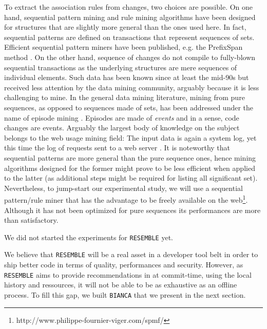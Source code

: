 To extract the association rules from changes,
two choices are possible. On one hand, sequential pattern mining and rule mining algorithms
have been designed for structures that are slightly more general than the ones used here.
In fact, sequential patterns are defined on transactions that represent sequences of sets.
Efficient sequential pattern miners have been published, e.g. the PrefixSpan method \cite{Pei2004}.
On the other hand, sequence of changes do not compile to fully-blown sequential transactions as the underlying structures are mere sequences of individual elements. Such data has been known since at least the mid-90s but received less attention by the data mining community, arguably because it is less challenging to mine.
In the general data mining literature, mining from pure sequences, as opposed to sequences made of sets, has been addressed under the name of episode mining \cite{HEIKKI1997}.
Episodes are made of \textit{events} and in a sense, code changes are events. Arguably the largest body of knowledge on the subject belongs to the web usage mining field: The input data is again a system log, yet this time the log of requests sent to a web server \cite{Pei2000}.
It is noteworthy that sequential patterns are more general than the pure sequence ones, hence mining algorithms designed for the former might prove to be less efficient when applied to the latter (as additional steps might be required for listing all significant set).
Nevertheless, to jump-start our experimental study, we will use a sequential pattern/rule miner that has the advantage to be freely available on the web\footnote{http://www.philippe-fournier-viger.com/spmf/}.
Although it has not been optimized for pure sequences its performances are more than satisfactory.

We did not started the experiments for {\tt RESEMBLE} yet.

We believe that {\tt RESEMBLE} will be a real asset in a developer tool belt in order to ship better code in terms of quality, performances and security.
However, as {\tt RESEMBLE} aims to provide recommendations in at commit-time, using the local history and ressources, it will not be able to be as exhaustive as an offline process.
To fill this gap, we built {\tt BIANCA} that we present in the next section.
